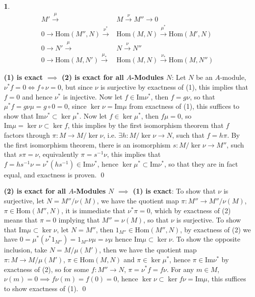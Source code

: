 \documentclass[11pt]{article}
\theoremstyle{definition}
\newtheorem{pb}{}
\newcommand{\ho}{\text{Hom}}
\begin{document}
    \begin{pb}
        \begin{align}
            M' \overset{\mu}{\longrightarrow} &M \overset{\nu}{\longrightarrow} M'' \to 0 \\
            0 \to \ho(M'',N) \overset{\nu^*}{\longrightarrow}&\ho(M,N)\overset{\mu^*}{\longrightarrow}\ho(M',N) \\
            0 \to N' \overset{\mu}{\longrightarrow} &N \overset{\nu}{\longrightarrow} N'' \\
            0 \to \ho(M,N') \overset{\mu_*}{\longrightarrow} &\ho(M,N) \overset{\nu_*}{\longrightarrow} \ho(M,N'')
        \end{align}

        \textbf{(1) is exact \(\mathbf{\implies}\) (2) is exact for all \(A\)-Modules \(N\)}: Let \(N\) be an \(A\)-module, \(\nu^*f = 0 \iff f \circ \nu = 0\), but since \(\nu\) is surjective by exactness of (1), this implies that \(f = 0\) and hence \(\nu^*\) is injective. Now let \(f \in \text{Im}\nu^*\), then \(f = g\nu\), so that \(\mu^*f = g\nu\mu  = g \circ 0 = 0\), since \(\ker \nu = \text{Im} \mu\) from exactness of (1), this suffices to show that \(\text{Im} \nu^* \subset \ker \mu^*\). Now let \(f \in \ker \mu^*\), then \(f \mu = 0\), so \(\text{Im}\mu = \ker \nu \subset \ker f\), this implies by the first isomorphism theorem that \(f\) factors through \(\pi: M \to M/\ker\nu\), i.e. \(\exists h : M/\ker\nu \to N\), such that \(f = h \pi\). By the first isomorphism theorem, there is an isomorphism \(s: M/\ker \nu \to M''\), such that \(s \pi = \nu\), equivalently \(\pi = s^{-1}\nu\), this implies that \(f = hs^{-1}\nu = \nu^*(hs^{-1})\in \text{Im}\nu^*\), hence \(\ker \mu^* \subset \text{Im}\nu^*\), so that they are in fact equal, and exactness is proven. \qed

        \textbf{(2) is exact for all \(A\)-Modules \(N\) \(\mathbf{\implies}\) (1) is exact}:
        To show that \(\nu\) is surjective, let \(N = M''/\nu(M)\), we have the quotient map \(\pi: M'' \to M''/\nu(M)\), \(\pi \in \ho(M'',N)\), it is immediate that \(\nu^*\pi = 0\), which by exactness of (2) means that \(\pi = 0\) implying that \(M'' = \nu(M)\), so that \(\nu\) is surjective. To show that \(\text{Im}\mu \subset \ker \nu\), let \(N = M''\), then \(1_{M''} \in \ho(M'',N)\), by exactness of (2) we have \(0 = \mu^*(\nu^*1_{M''}) = 1_{M''}\nu \mu = \nu\mu\) hence \(\text{Im}\mu \subset \ker \nu\). To show the opposite inclusion, take \(N = M/\mu(M')\), then we have the quotient map \(\pi: M \to M/\mu(M')\), \(\pi \in \ho(M,N)\) and \(\pi \in \ker \mu^*\), hence \(\pi \in \text{Im}\nu^*\) by exactness of (2), so for some \(f: M'' \to N\), \(\pi = \nu^*f = f\nu\). For any \(m \in M\), \(\nu(m) = 0 \implies f\nu(m) = f(0) = 0\), hence \(\ker \nu \subset \ker f\nu = \text{Im}\mu\), this suffices to show exactness of (1). \qed


\end{pb}
\end{document}
